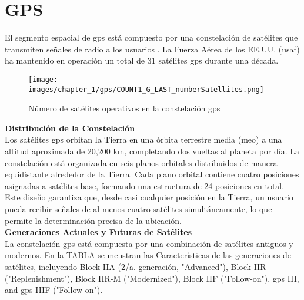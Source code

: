 \section{GPS}
\label{sec:gps}


\begin{justify}
    El segmento espacial de \gls{gps} está compuesto por una constelación de satélites que transmiten señales de radio a los usuarios \parencite{gpsgov}.
    La Fuerza Aérea de los EE.UU. (\gls{usaf}) ha mantenido en operación un total de 31 satélites \gls{gps} durante una década.\\

    \begin{figure}[H]
        \centering
        \texttt{[image: images/chapter\_1/gps/COUNT1\_G\_LAST\_numberSatellites.png]}
        \caption{Número de satélites operativos en la constelación \gls{gps}}
        \label{fig:gps_numSatellites}
    \end{figure}

    \noindent\textbf{Distribución de la Constelación}\\
    Los satélites \gls{gps} orbitan la Tierra en una órbita terrestre media (\gls{meo}) a una altitud aproximada de 20,200 km, completando
    dos vueltas al planeta por día. La constelación está organizada en seis planos orbitales distribuidos de manera equidistante alrededor
    de la Tierra. Cada plano orbital contiene cuatro posiciones asignadas a satélites base, formando una estructura de 24 posiciones en total.
    Este diseño garantiza que, desde casi cualquier posición en la Tierra, un usuario pueda recibir señales de al menos cuatro satélites simultáneamente,
    lo que permite la determinación precisa de la ubicación.\\

    \noindent\textbf{Generaciones Actuales y Futuras de Satélites}\\
    La constelación \gls{gps} está compuesta por una combinación de satélites antiguos y modernos. En la TABLA se meustran las Características de las
    generaciones de satélites, incluyendo Block IIA (2/a. generación, "Advanced"), Block IIR ("Replenishment"), Block IIR-M ("Modernized"), Block IIF ("Follow-on"),
    \gls{gps} III, and \gls{gps} IIIF ("Follow-on").
\end{justify}

